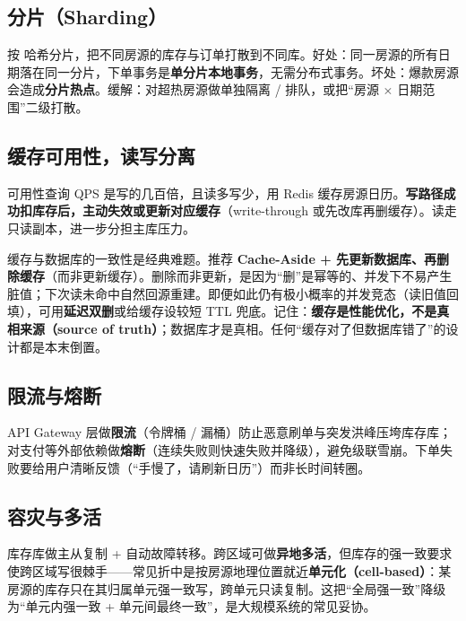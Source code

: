 \subsection{分片（Sharding）}

按  哈希分片，把不同房源的库存与订单打散到不同库。好处：同一房源的所有日期落在同一分片，下单事务是\textbf{单分片本地事务}，无需分布式事务。坏处：爆款房源会造成\textbf{分片热点}。缓解：对超热房源做单独隔离 / 排队，或把“房源 $\times$ 日期范围”二级打散。

\subsection{缓存可用性，读写分离}

可用性查询 QPS 是写的几百倍，且读多写少，用 Redis 缓存房源日历。\textbf{写路径成功扣库存后，主动失效或更新对应缓存}（write-through 或先改库再删缓存）。读走只读副本，进一步分担主库压力。

\begin{idea}
缓存与数据库的一致性是经典难题。推荐 \textbf{Cache-Aside + 先更新数据库、再删除缓存}（而非更新缓存）。删除而非更新，是因为“删”是幂等的、并发下不易产生脏值；下次读未命中自然回源重建。即便如此仍有极小概率的并发竞态（读旧值回填），可用\textbf{延迟双删}或给缓存设较短 TTL 兜底。记住：\textbf{缓存是性能优化，不是真相来源（source of truth）}；数据库才是真相。任何“缓存对了但数据库错了”的设计都是本末倒置。
\end{idea}

\subsection{限流与熔断}

API Gateway 层做\textbf{限流}（令牌桶 / 漏桶）防止恶意刷单与突发洪峰压垮库存库；对支付等外部依赖做\textbf{熔断}（连续失败则快速失败并降级），避免级联雪崩。下单失败要给用户清晰反馈（“手慢了，请刷新日历”）而非长时间转圈。

\subsection{容灾与多活}

库存库做主从复制 + 自动故障转移。跨区域可做\textbf{异地多活}，但库存的强一致要求使跨区域写很棘手——常见折中是按房源地理位置就近\textbf{单元化（cell-based）}：某房源的库存只在其归属单元强一致写，跨单元只读复制。这把“全局强一致”降级为“单元内强一致 + 单元间最终一致”，是大规模系统的常见妥协。

